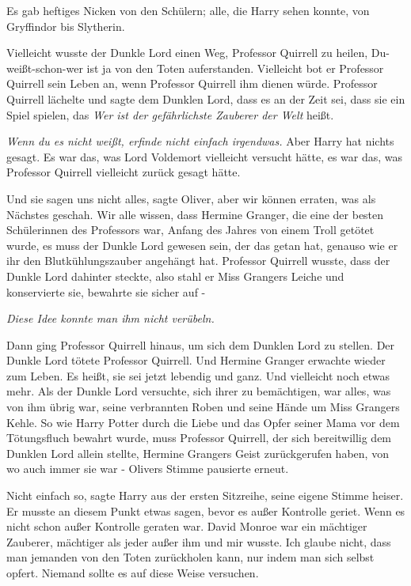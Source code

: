 Es gab heftiges Nicken von den Schülern; alle, die Harry sehen konnte, von
Gryffindor bis Slytherin.

\glqq{}Vielleicht wusste der Dunkle Lord einen Weg, Professor Quirrell zu heilen,
Du-weißt-schon-wer ist ja von den Toten auferstanden. Vielleicht bot er
Professor Quirrell sein Leben an, wenn Professor Quirrell ihm dienen würde.
Professor Quirrell lächelte und sagte dem Dunklen Lord, dass es an der Zeit sei,
dass sie ein Spiel spielen, das \emph{\glqq{}Wer ist der gefährlichste Zauberer
der Welt\grqq{}} heißt.\emph{\grqq}

\emph{Wenn du es nicht weißt, erfinde nicht einfach irgendwas.}
Aber Harry hat nichts gesagt. Es war das, was Lord Voldemort vielleicht versucht
hätte, es war das, was Professor Quirrell vielleicht zurück gesagt hätte.

\glqq{}Und sie sagen uns nicht alles\grqq{}, sagte Oliver, \glqq{}aber wir können
erraten, was als Nächstes geschah. Wir alle wissen, dass Hermine Granger, die
eine der besten Schülerinnen des Professors war, Anfang des Jahres von einem
Troll getötet wurde, es muss der Dunkle Lord gewesen sein, der das getan hat,
genauso wie er ihr den Blutkühlungszauber angehängt hat. Professor Quirrell
wusste, dass der Dunkle Lord dahinter steckte, also stahl er Miss Grangers
Leiche und konservierte sie, bewahrte sie sicher auf -\grqq{}

\emph{Diese Idee konnte man ihm nicht verübeln.}

\glqq{}Dann ging Professor Quirrell hinaus, um sich dem Dunklen Lord zu stellen.
Der Dunkle Lord tötete Professor Quirrell. Und Hermine Granger erwachte wieder
zum Leben. Es heißt, sie sei jetzt lebendig und ganz. Und vielleicht noch etwas
mehr. Als der Dunkle Lord versuchte, sich ihrer zu bemächtigen, war alles, was
von ihm übrig war, seine verbrannten Roben und seine Hände um Miss Grangers
Kehle. So wie Harry Potter durch die Liebe und das Opfer seiner Mama vor dem
Tötungsfluch bewahrt wurde, muss Professor Quirrell, der sich bereitwillig dem
Dunklen Lord allein stellte, Hermine Grangers Geist zurückgerufen haben, von wo
auch immer sie war -\grqq{} Olivers Stimme pausierte erneut.

\glqq{}Nicht einfach so\grqq{}, sagte Harry aus der ersten Sitzreihe, seine
eigene Stimme heiser. Er musste an diesem Punkt etwas sagen, bevor es außer
Kontrolle geriet. Wenn es nicht schon außer Kontrolle geraten war. \glqq{}David
Monroe war ein mächtiger Zauberer, mächtiger als jeder außer ihm und mir wusste.
Ich glaube nicht, dass man jemanden von den Toten zurückholen kann, nur indem
man sich selbst opfert. Niemand sollte es auf diese Weise versuchen.\grqq{}

